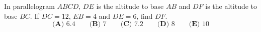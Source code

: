 In parallelogram $ABCD$, $DE$ is the altitude to base $AB$ and $DF$ is the altitude to base $BC$. If $DC=12$, $EB=4$ and $DE=6$, find $DF$.
\[
\textbf{(A) } 6.4\qquad\textbf{(B) } 7\qquad\textbf{(C) } 7.2\qquad\textbf{(D) } 8\qquad\textbf{(E) } 10
\]
